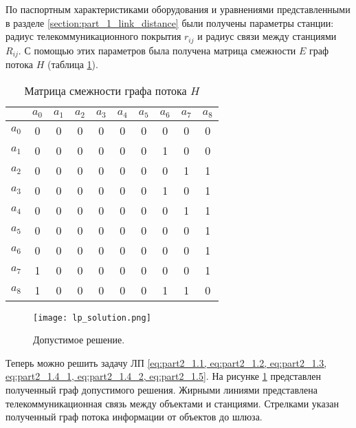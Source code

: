 По паспортным характеристиками оборудования и уравнениями представленными в разделе \cref{section:part_1_link_distance} были получены параметры станции: радиус телекоммуникационного покрытия $r_{ij}$ и радиус связи между станциями $R_{ij}$. С помощью этих параметров была получена матрица смежности $E$ граф потока $H$ (таблица \cref{tab:part3_lp_adj_mat}).




\begin{table}[h!]\centering
\begin{tabular}{|c|| c| c c c c c| c c c|}\hline
    
    & $a_0$& $a_1$& $a_2$& $a_3$& $a_4$& $a_5$& $a_6$& $a_7$ & $a_8$\\
    \hline
    \hline
    $a_0$ & 0&	0&	0&	0&	0&	0&	0 &	0&	0\\
    \hline
    $a_1$ & 0&	0&	0&	0&	0&	0&	1 &	0&	0\\
    $a_2$ & 0&	0&	0&	0&	0&	0&	0 &	1&	1\\
    $a_3$ & 0&	0&	0&	0&	0&	0&	1 &	0&	1\\
    $a_4$ & 0&	0&	0&	0&	0&	0&	0 &	1&	1\\
    $a_5$ & 0&	0&	0&	0&	0&	0&	0 &	0&	1\\
    \hline
    $a_6$ & 0&	0&	0&	0&	0&	0&	0 &	0&	1\\
    $a_7$ & 1&	0&	0&	0&	0&	0&	0 &	0&	1\\
    $a_8$ & 1&	0&	0&	0&	0&	0&	1 &	1&	0\\
    \hline
\end{tabular}\caption{Матрица смежности графа потока $H$}\label{tab:part3_lp_adj_mat}
\end{table}



\begin{figure}[h!]
    \centering
        \texttt{[image: lp\_solution.png]}
    \caption{Допустимое решение.}
    \label{fig:part3_lp_solution}
\end{figure}

Теперь можно решить задачу ЛП \cref{eq:part2_1.1, eq:part2_1.2, eq:part2_1.3, eq:part2_1.4_1, eq:part2_1.4_2, eq:part2_1.5}. На рисунке \cref{fig:part3_lp_solution} представлен полученный граф допустимого решения. Жирными линиями представлена телекоммуникационная связь между объектами и станциями. Стрелками указан полученный граф потока информации от объектов до шлюза. 


